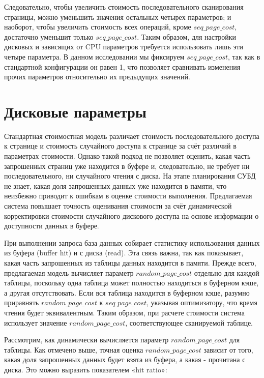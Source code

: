 Следовательно, чтобы увеличить стоимость последовательного сканирования страницы, можно уменьшить значения остальных четырех параметров; и наоборот, чтобы увеличить стоимость всех операций, кроме \(seq\_page\_cost\), достаточно уменьшит только \(seq\_page\_cost\). Таким образом, для настройки дисковых и зависящих от CPU параметров требуется использовать лишь эти четыре параметра. В данном исследовании мы фиксируем \(seq\_page\_cost\), так как в стандартной конфигурации он равен 1, что позволяет сравнивать изменения прочих параметров относительно их предыдущих значений.


\section{Дисковые параметры}\label{sec:ch1/sec2}

Стандартная стоимостная модель различает стоимость последовательного доступа к странице и стоимость случайного доступа к странице за счёт различий в параметрах стоимости. Однако такой подход не позволяет оценить, какая часть запрошенных страниц уже находится в буфере и, следовательно, не требует ни последовательного, ни случайного чтения с диска. На этапе планирования СУБД не знает, какая доля запрошенных данных уже находится в памяти, что неизбежно приводит к ошибкам в оценке стоимости выполнения. Предлагаемая система повышает точность оценивания стоимости за счёт динамической корректировки стоимости случайного дискового доступа на основе информации о доступности данных в буфере.

При выполнении запроса база данных собирает статистику использования данных из буфера (buffer hit) и с диска (read). Эта связь важна, так как показывает, какая часть запрошенных из таблицы данных находится в памяти. Прежде всего, предлагаемая модель вычисляет параметр \(random\_page\_cost\) отдельно для каждой таблицы, поскольку одна таблица может полностью находиться в буферном кэше, а другая отсутствовать. Если вся таблица находится в буферном кэше, разумно приравнять \(random\_page\_cost\) к \(seq\_page\_cost\), указывая оптимизатору, что время чтения будет эквивалентным. Таким образом, при расчете стоимости система использует значение \(random\_page\_cost\), соответствующее сканируемой таблице.

Рассмотрим, как динамически вычисляется параметр \(random\_page\_cost\) для таблицы. Как отмечено выше, точная оценка \(random\_page\_cost\) зависит от того, какая доля запрошенных данных будет взята из буфера, а какая - прочитана с диска. Это можно выразить показателем «hit ratio»:

